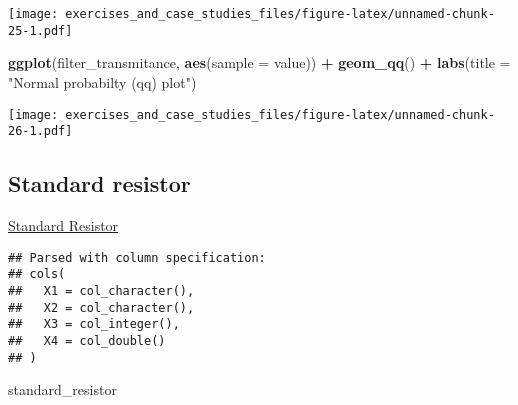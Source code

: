 \documentclass[]{book}
\newenvironment{Shaded}{\begin{snugshade}}{\end{snugshade}}
\newcommand{\DataTypeTok}[1]{\textcolor[rgb]{0.13,0.29,0.53}{#1}}
\newcommand{\DecValTok}[1]{\textcolor[rgb]{0.00,0.00,0.81}{#1}}
\newcommand{\KeywordTok}[1]{\textcolor[rgb]{0.13,0.29,0.53}{\textbf{#1}}}
\newcommand{\NormalTok}[1]{#1}
\newcommand{\OperatorTok}[1]{\textcolor[rgb]{0.81,0.36,0.00}{\textbf{#1}}}
\newcommand{\OtherTok}[1]{\textcolor[rgb]{0.56,0.35,0.01}{#1}}
\newcommand{\StringTok}[1]{\textcolor[rgb]{0.31,0.60,0.02}{#1}}
\theoremstyle{definition}
\theoremstyle{definition}
\theoremstyle{definition}
\theoremstyle{remark}
\begin{document}
\texttt{[image: exercises\_and\_case\_studies\_files/figure-latex/unnamed-chunk-25-1.pdf]}

\begin{Shaded}
\begin{Highlighting}[]
\KeywordTok{ggplot}\NormalTok{(filter_transmitance, }\KeywordTok{aes}\NormalTok{(}\DataTypeTok{sample =}\NormalTok{ value)) }\OperatorTok{+}
\StringTok{  }\KeywordTok{geom_qq}\NormalTok{() }\OperatorTok{+}
\StringTok{  }\KeywordTok{labs}\NormalTok{(}\DataTypeTok{title =} \StringTok{"Normal probabilty (qq) plot"}\NormalTok{)}
\end{Highlighting}
\end{Shaded}

\texttt{[image: exercises\_and\_case\_studies\_files/figure-latex/unnamed-chunk-26-1.pdf]}

\hypertarget{standard-resistor}{%
\subsection{Standard resistor}\label{standard-resistor}}

\href{https://www.itl.nist.gov/div898/handbook/eda/section4/eda427.htm}{Standard
Resistor}

\begin{Shaded}
\end{Shaded}

\begin{verbatim}
## Parsed with column specification:
## cols(
##   X1 = col_character(),
##   X2 = col_character(),
##   X3 = col_integer(),
##   X4 = col_double()
## )
\end{verbatim}

\begin{Shaded}
\begin{Highlighting}[]
\NormalTok{standard_resistor}
\end{Highlighting}
\end{Shaded}
\end{document}
